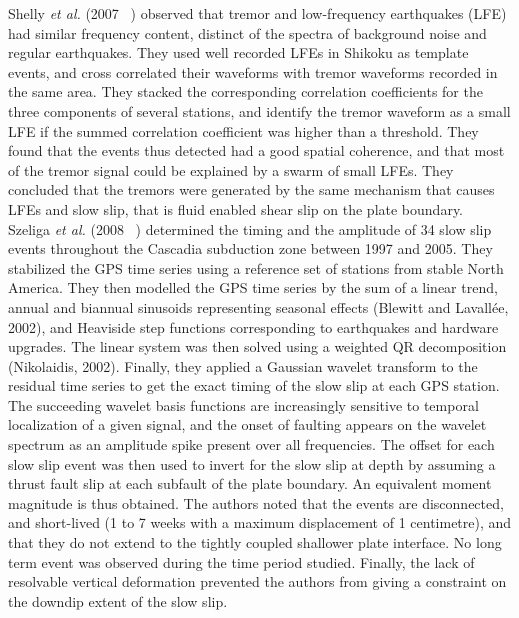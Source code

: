 \documentclass[main.tex]{subfiles}
\begin{document}
Shelly \textit{et al.} (2007 ~\cite{SHE_2007_nature}) observed that tremor and low-frequency earthquakes (LFE) had similar frequency content, distinct of the spectra of background noise and regular earthquakes. They used well recorded LFEs in Shikoku as template events, and cross correlated their waveforms with tremor waveforms recorded in the same area. They stacked the corresponding correlation coefficients for the three components of several stations, and identify the tremor waveform as a small LFE if the summed correlation coefficient was higher than a threshold. They found that the events thus detected had a good spatial coherence, and that most of the tremor signal could be explained by a swarm of small LFEs. They concluded that the tremors were generated by the same mechanism that causes LFEs and slow slip, that is fluid enabled shear slip on the plate boundary. \\

Szeliga \textit{et al.} (2008 ~\cite{SZE_2008}) determined the timing and the amplitude of 34 slow slip events throughout the Cascadia subduction zone between 1997 and 2005. They stabilized the GPS time series using a reference set of stations from stable North America. They then modelled the GPS time series by the sum of a linear trend, annual and biannual sinusoids representing seasonal effects (Blewitt and Lavall\'ee, 2002), and Heaviside step functions corresponding to earthquakes and hardware upgrades. The linear system was then solved using a weighted QR decomposition (Nikolaidis, 2002). Finally, they applied a Gaussian wavelet transform to the residual time series to get the exact timing of the slow slip at each GPS station. The succeeding wavelet basis functions are increasingly sensitive to temporal localization of a given signal, and the onset of faulting appears on the wavelet spectrum as an amplitude spike present over all frequencies. The offset for each slow slip event was then used to invert for the slow slip at depth by assuming a thrust fault slip at each subfault of the plate boundary. An equivalent moment magnitude is thus obtained. The authors noted that the events are disconnected, and short-lived (1 to 7 weeks with a maximum displacement of 1 centimetre), and that they do not extend to the tightly coupled shallower plate interface. No long term event was observed during the time period studied. Finally, the lack of resolvable vertical deformation prevented the authors from giving a constraint on the downdip extent of the slow slip. \\
\end{document}
